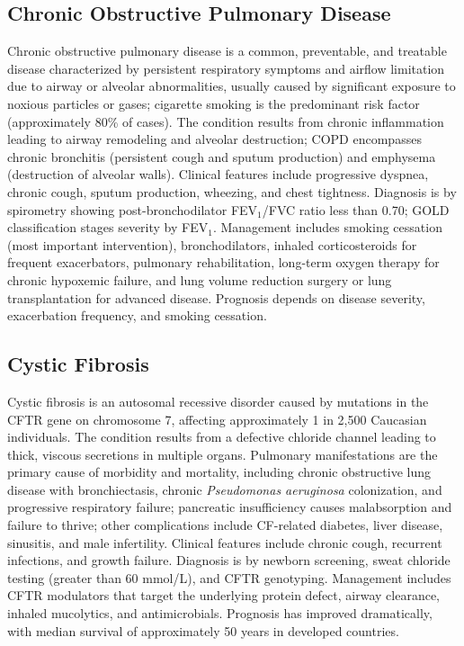 \subsection{Chronic Obstructive Pulmonary Disease}
\label{sec:Chronic Obstructive Pulmonary Disease}
Chronic obstructive pulmonary disease is a common, preventable, and treatable disease characterized by persistent respiratory symptoms and airflow limitation due to airway or alveolar abnormalities, usually caused by significant exposure to noxious particles or gases; cigarette smoking is the predominant risk factor (approximately 80\% of cases). The condition results from chronic inflammation leading to airway remodeling and alveolar destruction; COPD encompasses chronic bronchitis (persistent cough and sputum production) and emphysema (destruction of alveolar walls). Clinical features include progressive dyspnea, chronic cough, sputum production, wheezing, and chest tightness. Diagnosis is by spirometry showing post-bronchodilator FEV$_1$/FVC ratio less than 0.70; GOLD classification stages severity by FEV$_1$. Management includes smoking cessation (most important intervention), bronchodilators, inhaled corticosteroids for frequent exacerbators, pulmonary rehabilitation, long-term oxygen therapy for chronic hypoxemic failure, and lung volume reduction surgery or lung transplantation for advanced disease. Prognosis depends on disease severity, exacerbation frequency, and smoking cessation.

\subsection{Cystic Fibrosis}
\label{sec:Cystic Fibrosis}
Cystic fibrosis is an autosomal recessive disorder caused by mutations in the CFTR gene on chromosome 7, affecting approximately 1 in 2,500 Caucasian individuals. The condition results from a defective chloride channel leading to thick, viscous secretions in multiple organs. Pulmonary manifestations are the primary cause of morbidity and mortality, including chronic obstructive lung disease with bronchiectasis, chronic \textit{Pseudomonas aeruginosa} colonization, and progressive respiratory failure; pancreatic insufficiency causes malabsorption and failure to thrive; other complications include CF-related diabetes, liver disease, sinusitis, and male infertility. Clinical features include chronic cough, recurrent infections, and growth failure. Diagnosis is by newborn screening, sweat chloride testing (greater than 60 mmol/L), and CFTR genotyping. Management includes CFTR modulators that target the underlying protein defect, airway clearance, inhaled mucolytics, and antimicrobials. Prognosis has improved dramatically, with median survival of approximately 50 years in developed countries.

